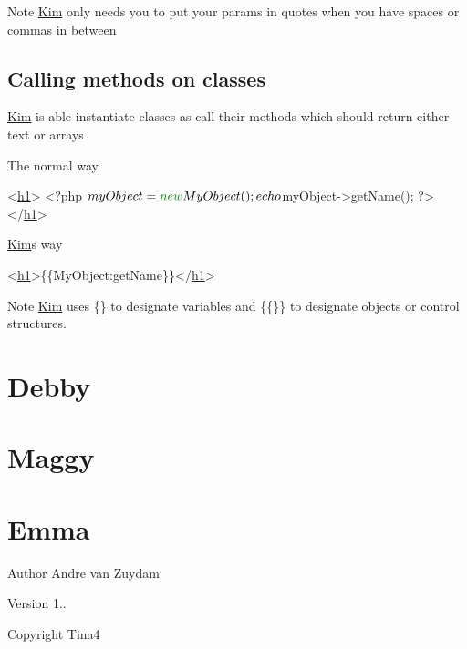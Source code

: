 \begin{DoxyNote}{Note}
\hyperlink{classKim}{Kim} only needs you to put your params in quotes when you have spaces or commas in between
\end{DoxyNote}
\hypertarget{index_kim_classes}{}\subsection{Calling methods on classes}\label{index_kim_classes}
\hyperlink{classKim}{Kim} is able instantiate classes as call their methods which should return either text or arrays

The normal way 
\begin{DoxyCode}
<\hyperlink{Shape_8php_a92ed2229ea45cf3c0e84a02cf12a7533}{h1}>
<?php
  $myObject = \textcolor{keyword}{new} MyObject();
  echo $myObject->getName();
?>
</\hyperlink{Shape_8php_a92ed2229ea45cf3c0e84a02cf12a7533}{h1}>
\end{DoxyCode}


\hyperlink{classKim}{Kim}\textquotesingle{}s way 
\begin{DoxyCode}
<\hyperlink{Shape_8php_a92ed2229ea45cf3c0e84a02cf12a7533}{h1}>\{\{MyObject:getName\}\}</\hyperlink{Shape_8php_a92ed2229ea45cf3c0e84a02cf12a7533}{h1}>
\end{DoxyCode}


\begin{DoxyNote}{Note}
\hyperlink{classKim}{Kim} uses \{\} to designate variables and \{\{\}\} to designate objects or control structures.
\end{DoxyNote}
\hypertarget{index_debby}{}\section{Debby}\label{index_debby}
\hypertarget{index_maggy}{}\section{Maggy}\label{index_maggy}
\hypertarget{index_emma}{}\section{Emma}\label{index_emma}


\begin{DoxyAuthor}{Author}
Andre van Zuydam 
\end{DoxyAuthor}
\begin{DoxyVersion}{Version}
1.. 
\end{DoxyVersion}
\begin{DoxyCopyright}{Copyright}
Tina4 
\end{DoxyCopyright}
